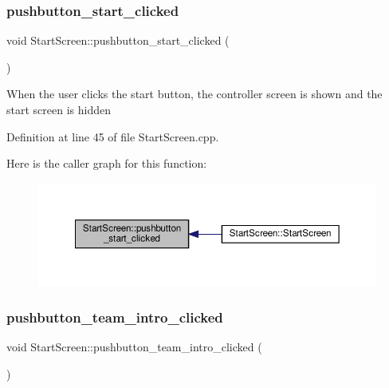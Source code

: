 \subsubsection{\texorpdfstring{pushbutton\+\_\+start\+\_\+clicked}{pushbutton\_start\_clicked}}
{\footnotesize\ttfamily void Start\+Screen\+::pushbutton\+\_\+start\+\_\+clicked (\begin{DoxyParamCaption}{ }\end{DoxyParamCaption})\hspace{0.3cm}{\ttfamily [slot]}}

When the user clicks the start button, the controller screen is shown and the start screen is hidden 

Definition at line 45 of file Start\+Screen.\+cpp.

Here is the caller graph for this function\+:
\nopagebreak
\begin{figure}[H]
\begin{center}
\leavevmode
\includegraphics[width=350pt]{class_start_screen_a8343a5d292a0361ae1a760ff109f5740_icgraph}
\end{center}
\end{figure}
\mbox{\label{class_start_screen_a5b2dcf2fc1bf0bae99674a1d2f7c4771}} 
\subsubsection{\texorpdfstring{pushbutton\+\_\+team\+\_\+intro\+\_\+clicked}{pushbutton\_team\_intro\_clicked}}
{\footnotesize\ttfamily void Start\+Screen\+::pushbutton\+\_\+team\+\_\+intro\+\_\+clicked (\begin{DoxyParamCaption}{ }\end{DoxyParamCaption})\hspace{0.3cm}{\ttfamily [slot]}}

